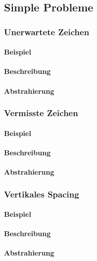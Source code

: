 \subsection{Simple Probleme}\label{problems:simple}
\subsubsection{Unerwartete Zeichen}\label{problems:unexpectedCharacters}
\paragraph{Beispiel}
\paragraph{Beschreibung}
\paragraph{Abstrahierung}

\subsubsection{Vermisste Zeichen}\label{problems:missingCharacters}
\paragraph{Beispiel}
\paragraph{Beschreibung}
\paragraph{Abstrahierung}

\subsubsection{Vertikales Spacing}\label{problems:verticalSpacing}
\paragraph{Beispiel}
\paragraph{Beschreibung}
\paragraph{Abstrahierung}

